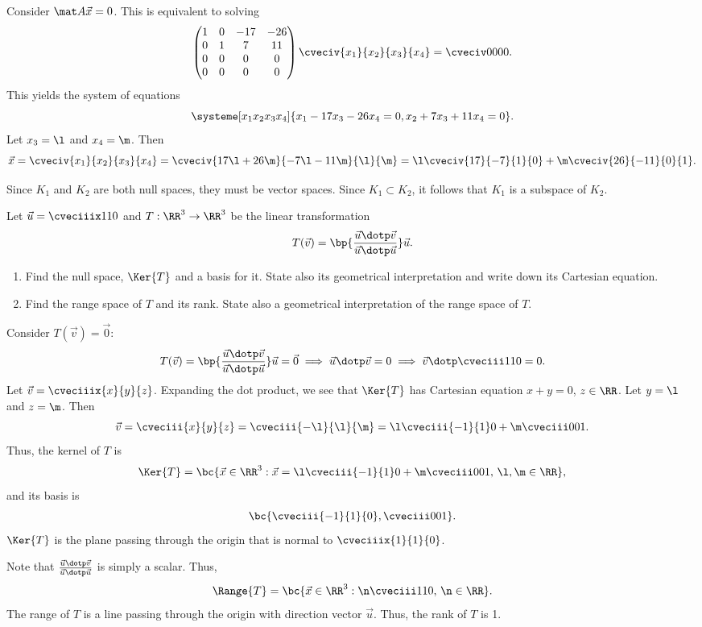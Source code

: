 \begin{solution}
\begin{ppart}
    \end{ppart}
    \begin{ppart}
        Consider $\mat A \vec x = 0$. This is equivalent to solving \[\begin{pmatrix}1 & 0 & -17 & -26 \\ 0 & 1 & 7 & 11 \\ 0 & 0 & 0 & 0 \\ 0 & 0 & 0 & 0\end{pmatrix} \cveciv{x_1}{x_2}{x_3}{x_4} = \cveciv0000.\] This yields the system of equations \[\systeme[x_1x_2x_3x_4]{x_1 - 17x_3 - 26x_4 = 0, x_2 + 7x_3 + 11x_4 = 0}.\] Let $x_3 = \l$ and $x_4 = \m$. Then \[\vec x = \cveciv{x_1}{x_2}{x_3}{x_4} = \cveciv{17\l + 26\m}{-7\l - 11 \m}{\l}{\m} = \l \cveciv{17}{-7}{1}{0} + \m \cveciv{26}{-11}{0}{1}.\]

        Since $K_1$ and $K_2$ are both null spaces, they must be vector spaces. Since $K_1 \subset K_2$, it follows that $K_1$ is a subspace of $K_2$.
    \end{ppart}
\end{solution}

\begin{problem}
    Let $\vec u = \cveciiix110$ and $T : \RR^3 \to \RR^3$ be the linear transformation \[T(\vec v) = \bp{\frac{\vec u \dotp \vec v}{\vec u \dotp \vec u}} \vec u.\]

    \begin{enumerate}
        \item Find the null space, $\Ker{T}$ and a basis for it. State also its geometrical interpretation and write down its Cartesian equation.
        \item Find the range space of $T$ and its rank. State also a geometrical interpretation of the range space of $T$.
    \end{enumerate}
\end{problem}
\clearpage
\begin{solution}
    \begin{ppart}
        Consider $T(\vec v) = \vec 0$: \[T(\vec v) = \bp{\frac{\vec u \dotp \vec v}{\vec u \dotp \vec u}} \vec u = \vec 0 \implies \vec u \dotp \vec v = 0 \implies \vec v \dotp \cveciii110 = 0.\] Let $\vec v = \cveciiix{x}{y}{z}$. Expanding the dot product, we see that $\Ker{T}$ has Cartesian equation $x + y = 0$, $z \in \RR$. Let $y = \l$ and $z = \m$. Then \[\vec v = \cveciii{x}{y}{z} = \cveciii{-\l}{\l}{\m} = \l \cveciii{-1}{1}0 + \m \cveciii001.\] Thus, the kernel of $T$ is \[\Ker{T} = \bc{\vec x \in \RR^3 : \vec x = \l \cveciii{-1}{1}0 + \m \cveciii001, \, \l, \m \in \RR},\] and its basis is \[\bc{\cveciii{-1}{1}{0}, \cveciii001}.\] $\Ker{T}$ is the plane passing through the origin that is normal to $\cveciiix{1}{1}{0}$. 
    \end{ppart}
    \begin{ppart}
        Note that $\frac{\vec u \dotp \vec v}{\vec u \dotp \vec u}$ is simply a scalar. Thus, \[\Range{T} = \bc{\vec x \in \RR^3 : \n \cveciii110, \, \n \in \RR}.\] The range of $T$ is a line passing through the origin with direction vector $\vec u$. Thus, the rank of $T$ is 1. 
    \end{ppart}
\end{solution}

